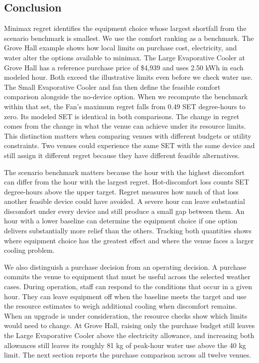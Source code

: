 \subsection{Conclusion}

Minimax regret identifies the equipment choice whose largest shortfall from the scenario benchmark is smallest. We use the comfort ranking as a benchmark. The Grove Hall example shows how local limits on purchase cost, electricity, and water alter the options available to minimax. The Large Evaporative Cooler at Grove Hall has a reference purchase price of \$4,939 and uses 2.50 kWh in each modeled hour. Both exceed the illustrative limits even before we check water use. The Small Evaporative Cooler and fan then define the feasible comfort comparison alongside the no-device option. When we recompute the benchmark within that set, the Fan's maximum regret falls from 0.49 SET degree-hours to zero. Its modeled SET is identical in both comparisons. The change in regret comes from the change in what the venue can achieve under its resource limits. This distinction matters when comparing venues with different budgets or utility constraints. Two venues could experience the same SET with the same device and still assign it different regret because they have different feasible alternatives.

The scenario benchmark matters because the hour with the highest discomfort can differ from the hour with the largest regret. Hot-discomfort loss counts SET degree-hours above the upper target. Regret measures how much of that loss another feasible device could have avoided. A severe hour can leave substantial discomfort under every device and still produce a small gap between them. An hour with a lower baseline can determine the equipment choice if one option delivers substantially more relief than the others. Tracking both quantities shows where equipment choice has the greatest effect and where the venue faces a larger cooling problem.

We also distinguish a purchase decision from an operating decision. A purchase commits the venue to equipment that must be useful across the selected weather cases. During operation, staff can respond to the conditions that occur in a given hour. They can leave equipment off when the baseline meets the target and use the resource estimates to weigh additional cooling when discomfort remains. When an upgrade is under consideration, the resource checks show which limits would need to change. At Grove Hall, raising only the purchase budget still leaves the Large Evaporative Cooler above the electricity allowance, and increasing both allowances still leaves its roughly 81 kg of peak-hour water use above the 40 kg limit. The next section reports the purchase comparison across all twelve venues.
